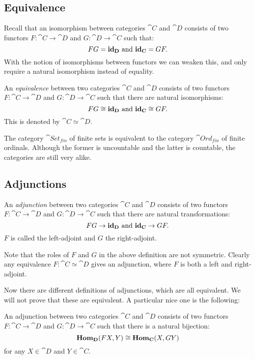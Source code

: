 \subsection{Equivalence}
Recall that an isomorphism between categories $\cat{C}$ and $\cat{D}$ consists of two functors $F:\cat{C} \to \cat{D}$ and $G: \cat{D} \to \cat{C}$ such that:
$$ FG = \mathbf{id}_{\mathbf{D}} \text{ and } \mathbf{id}_{\mathbf{C}} = GF. $$
With the notion of isomorphisms between functors we can weaken this, and only require a natural isomorphism instead of equality.

\begin{definition}
	An \emph{equivalence} between two categories $\cat{C}$ and $\cat{D}$ consists of two functors $F:\cat{C} \to \cat{D}$ and $G: \cat{D} \to \cat{C}$ such that there are natural isomorphisms:
	$$ FG \cong \mathbf{id}_{\mathbf{D}} \text{ and } \mathbf{id}_{\mathbf{C}} \cong GF. $$
	This is denoted by $\cat{C} \simeq \cat{D}$.
\end{definition}

\begin{example}
	The category $\cat{Set_{fin}}$ of finite sets is equivalent to the category $\cat{Ord_{fin}}$ of finite ordinals. Although the former is uncountable and the latter is countable, the categories are still very alike.
\end{example}

\subsection{Adjunctions}
\begin{definition}
	An \emph{adjunction} between two categories $\cat{C}$ and $\cat{D}$ consists of two functors $F:\cat{C} \to \cat{D}$ and $G: \cat{D} \to \cat{C}$ such that there are natural transformations:
	$$ FG \to \mathbf{id}_{\mathbf{D}} \text{ and } \mathbf{id}_{\mathbf{C}} \to GF. $$
	$F$ is called the left-adjoint and $G$ the right-adjoint.
\end{definition}

Note that the roles of $F$ and $G$ in the above definition are not symmetric. Clearly any equivalence $F: \cat{C} \simeq \cat{D}$ gives an adjunction, where $F$ is both a left and right-adjoint.

Now there are different definitions of adjunctions, which are all equivalent. We will not prove that these are equivalent. A particular nice one is the following:

\begin{definition}
	An adjunction between two categories $\cat{C}$ and $\cat{D}$ consists of two functors $F:\cat{C} \to \cat{D}$ and $G: \cat{D} \to \cat{C}$ such that there is a natural bijection:
	$$ \mathbf{Hom}_{\mathbf{D}}(FX, Y) \cong \mathbf{Hom}_{\mathbf{C}}(X, GY) $$
	for any $X \in \cat{D}$ and $Y \in \cat{C}$.
\end{definition}

